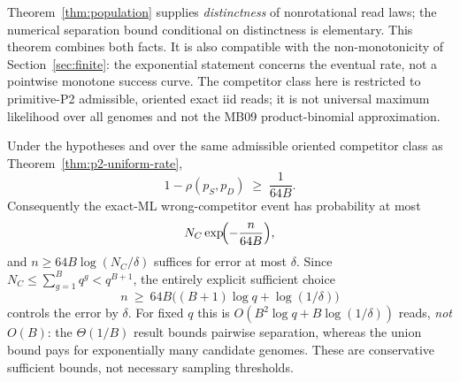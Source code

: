 Theorem~\ref{thm:population} supplies \emph{distinctness} of
nonrotational read laws; the numerical separation bound conditional
on distinctness is elementary. This theorem combines both facts.  It is
also compatible with the non-monotonicity of Section~\ref{sec:finite}: the
exponential statement concerns the eventual rate, not a pointwise monotone
success curve.  The competitor class here is restricted to primitive-P2
admissible, oriented exact iid reads; it is not universal maximum likelihood
over all genomes and not the MB09 product-binomial approximation.

\begin{proposition}
\label{prop:p2-linear-rate}
Under the hypotheses and over the same admissible oriented
competitor class as Theorem~\ref{thm:p2-uniform-rate},
\[
  1-\rho(p_S,p_D)\;\ge\;\frac{1}{64B}.
\]
Consequently the exact-ML wrong-competitor event has
probability at most
\[
  N_C\exp\!\Bigl(-\frac{n}{64B}\Bigr),
\]
and $n\ge64B\log(N_C/\delta)$ suffices for error
at most $\delta$.
Since $N_C\le\sum_{g=1}^{B}q^g<q^{B+1}$, the entirely
explicit sufficient choice
\[
 n\ \ge\ 64B\bigl((B+1)\log q+\log(1/\delta)\bigr)
\]
controls the error by $\delta$. For fixed $q$ this is
$O(B^2\log q+B\log(1/\delta))$ reads, \emph{not}
$O(B)$: the $\Theta(1/B)$ result bounds pairwise
separation, whereas the union bound pays for exponentially
many candidate genomes. These are conservative sufficient
bounds, not necessary sampling thresholds.
\end{proposition}
